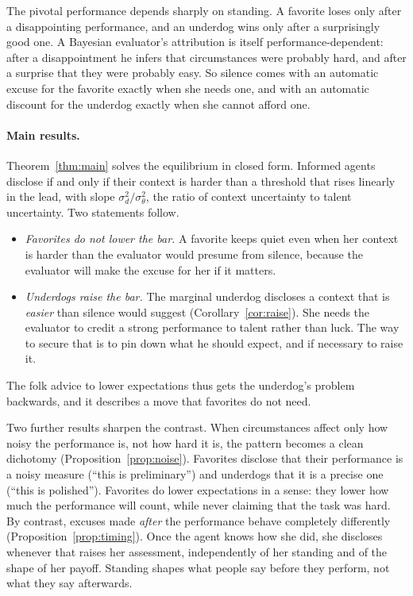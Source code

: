 \documentclass[11pt]{article}
\theoremstyle{definition}
\newcommand{\sd}{\sigma_d}
\newcommand{\sth}{\sigma_\theta}
\begin{document}
The pivotal performance depends sharply on standing. A favorite loses only after a disappointing performance, and an underdog wins only after a surprisingly good one. A Bayesian evaluator's attribution is itself performance-dependent: after a disappointment he infers that circumstances were probably hard, and after a surprise that they were probably easy. So silence comes with an automatic excuse for the favorite exactly when she needs one, and with an automatic discount for the underdog exactly when she cannot afford one.

\paragraph{Main results.} Theorem~\ref{thm:main} solves the equilibrium in closed form. Informed agents disclose if and only if their context is harder than a threshold that rises linearly in the lead, with slope $\sd^2/\sth^2$, the ratio of context uncertainty to talent uncertainty. Two statements follow.

\begin{itemize}
\item \emph{Favorites do not lower the bar.} A favorite keeps quiet even when her context is harder than the evaluator would presume from silence, because the evaluator will make the excuse for her if it matters.
\item \emph{Underdogs raise the bar.} The marginal underdog discloses a context that is \emph{easier} than silence would suggest (Corollary~\ref{cor:raise}). She needs the evaluator to credit a strong performance to talent rather than luck. The way to secure that is to pin down what he should expect, and if necessary to raise it.
\end{itemize}

The folk advice to lower expectations thus gets the underdog's problem backwards, and it describes a move that favorites do not need.

Two further results sharpen the contrast. When circumstances affect only how noisy the performance is, not how hard it is, the pattern becomes a clean dichotomy (Proposition~\ref{prop:noise}). Favorites disclose that their performance is a noisy measure (``this is preliminary'') and underdogs that it is a precise one (``this is polished''). Favorites do lower expectations in a sense: they lower how much the performance will count, while never claiming that the task was hard. By contrast, excuses made \emph{after} the performance behave completely differently (Proposition~\ref{prop:timing}). Once the agent knows how she did, she discloses whenever that raises her assessment, independently of her standing and of the shape of her payoff. Standing shapes what people say before they perform, not what they say afterwards.
\end{document}
